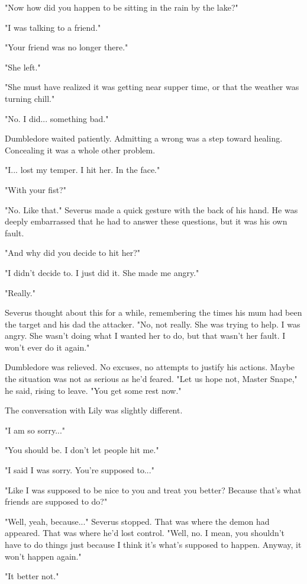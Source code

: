 \documentclass[a4paper,11pt]{article}
\begin{document}
"Now how did you happen to be sitting in the rain by the lake?"

"I was talking to a friend."

"Your friend was no longer there."

"She left."

"She must have realized it was getting near supper time, or that the weather was turning chill."

"No. I did... something bad."

Dumbledore waited patiently. Admitting a wrong was a step toward healing. Concealing it was a whole other problem.

"I... lost my temper. I hit her. In the face."

"With your fist?"

"No. Like that." Severus made a quick gesture with the back of his hand. He was deeply embarrassed that he had to answer these questions, but it was his own fault.

"And why did you decide to hit her?"

"I didn't decide to. I just did it. She made me angry."

"Really."

Severus thought about this for a while, remembering the times his mum had been the target and his dad the attacker. "No, not really. She was trying to help. I was angry. She wasn't doing what I wanted her to do, but that wasn't her fault. I won't ever do it again."

Dumbledore was relieved. No excuses, no attempts to justify his actions. Maybe the situation was not as serious as he'd feared. "Let us hope not, Master Snape," he said, rising to leave. "You get some rest now."

The conversation with Lily was slightly different.

"I am so sorry..."

"You should be. I don't let people hit me."

"I said I was sorry. You're supposed to..."

"Like I was supposed to be nice to you and treat you better? Because that's what friends are supposed to do?"

"Well, yeah, because..." Severus stopped. That was where the demon had appeared. That was where he'd lost control. "Well, no. I mean, you shouldn't have to do things just because I think it's what's supposed to happen. Anyway, it won't happen again."

"It better not."
\end{document}

